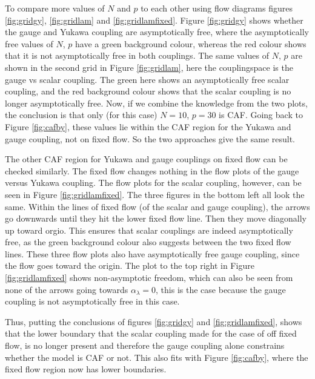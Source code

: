 To compare more values of $N$ and $p$ to each other using flow diagrams figures \ref{fig:gridgy}, \ref{fig:gridlam} and \ref{fig:gridlamfixed}. Figure \ref{fig:gridgy} shows whether the gauge and Yukawa coupling are asymptotically free, where the asymptotically free values of $N$, $p$ have a green background colour, whereas the red colour shows that it is not asymptotically free in both couplings. The same values of $N$, $p$ are shown in the second grid in Figure \ref{fig:gridlam}, here the couplingspace is the gauge vs scalar coupling. The green here shows an asymptotically free scalar coupling, and the red background colour shows that the scalar coupling is no longer asymptotically free. Now, if we combine the knowledge from the two plots, the conclusion is that only (for this case) $N=10$, $p=30$ is CAF. Going back to Figure \ref{fig:cafby}, these values lie within the CAF region for the Yukawa and gauge coupling, not on fixed flow. So the two approaches give the same result. 


The other CAF region for Yukawa and gauge couplings on fixed flow can be checked similarly. The fixed flow changes nothing in the flow plots of the gauge versus Yukawa coupling. The flow plots for the scalar coupling, however, can be seen in Figure \ref{fig:gridlamfixed}. The three figures in the bottom left all look the same. Within the lines of fixed flow (of the scalar and gauge coupling), the arrows go downwards until they hit the lower fixed flow line. Then they move diagonally up toward orgio. This ensures that scalar couplings are indeed asymptotically free, as the green background colour also suggests between the two fixed flow lines. These three flow plots also have asymptotically free gauge coupling, since the flow goes toward the origin. The plot to the top right in Figure \ref{fig:gridlamfixed} shows non-asymptotic freedom, which can also be seen from none of the arrows going towards $\alpha_\lambda=0$, this is the case because the gauge coupling is not asymptotically free in this case.

Thus, putting the conclusions of figures \ref{fig:gridgy} and \ref{fig:gridlamfixed}, shows that the lower boundary that the scalar coupling made for the case of off fixed flow, is no longer present and therefore the gauge coupling alone constrains whether the model is CAF or not. This also fits with Figure \ref{fig:cafby}, where the fixed flow region now has lower boundaries. 

